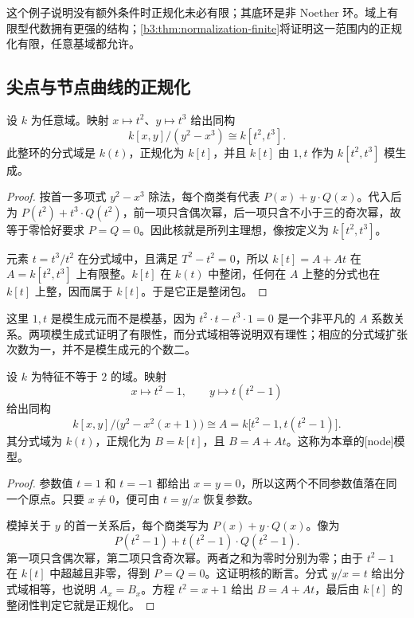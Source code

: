 这个例子说明没有额外条件时正规化未必有限；其底环是非 Noether 环。域上有限型代数拥有更强的结构；\cref{b3:thm:normalization-finite}将证明这一范围内的正规化有限，任意基域都允许。

\subsection{尖点与节点曲线的正规化}\label{b3:subsec:0604:03}

\begin{proposition}\label{b3:prop:cusp-normalization}
	设 \(k\) 为任意域。映射 \(x\mapsto t^2\)、\(y\mapsto t^3\) 给出同构
	\[
		k[x,y]/(y^2-x^3)\cong k[t^2,t^3].
	\]
	此整环的分式域是 \(k(t)\)，正规化为 \(k[t]\)，并且 \(k[t]\) 由 \(1,t\) 作为 \(k[t^2,t^3]\) 模生成。
\end{proposition}
\begin{proof}
	按首一多项式 \(y^2-x^3\) 除法，每个商类有代表 \(P(x)+y\cdot Q(x)\)。代入后为 \(P(t^2)+t^3\cdot Q(t^2)\)，前一项只含偶次幂，后一项只含不小于三的奇次幂，故等于零恰好要求 \(P=Q=0\)。因此核就是所列主理想，像按定义为 \(k[t^2,t^3]\)。

	元素 \(t=t^3/t^2\) 在分式域中，且满足 \(T^2-t^2=0\)，所以 \(k[t]=A+At\) 在 \(A=k[t^2,t^3]\) 上有限整。\(k[t]\) 在 \(k(t)\) 中整闭，任何在 \(A\) 上整的分式也在 \(k[t]\) 上整，因而属于 \(k[t]\)。于是它正是整闭包。
\end{proof}

这里 \(1,t\) 是模生成元而不是模基，因为 \(t^2\cdot t-t^3\cdot1=0\) 是一个非平凡的 \(A\) 系数关系。两项模生成式证明了有限性，而分式域相等说明双有理性；相应的分式域扩张次数为一，并不是模生成元的个数二。

\begin{proposition}\label{b3:prop:node-normalization}
	设 \(k\) 为特征不等于 \(2\) 的域。映射
	\[
		x\longmapsto t^2-1,\qquad y\longmapsto t(t^2-1)
	\]
	给出同构
	\[
		k[x,y]/\bigl(y^2-x^2(x+1)\bigr) \cong A=k\bigl[t^2-1,t(t^2-1)\bigr].
	\]
	其分式域为 \(k(t)\)，正规化为 \(B=k[t]\)，且 \(B=A+At\)。这称为本章的[node]模型。
\end{proposition}
\begin{proof}
	参数值 \(t=1\) 和 \(t=-1\) 都给出 \(x=y=0\)，所以这两个不同参数值落在同一个原点。只要 \(x\ne0\)，便可由 \(t=y/x\) 恢复参数。

	模掉关于 \(y\) 的首一关系后，每个商类写为 \(P(x)+y\cdot Q(x)\)。像为
	\[
		P(t^2-1)+t(t^2-1)\cdot Q(t^2-1).
	\]
	第一项只含偶次幂，第二项只含奇次幂。两者之和为零时分别为零；由于 \(t^2-1\) 在 \(k[t]\) 中超越且非零，得到 \(P=Q=0\)。这证明核的断言。分式 \(y/x=t\) 给出分式域相等，也说明 \(A_x=B_x\)。方程 \(t^2=x+1\) 给出 \(B=A+At\)，最后由 \(k[t]\) 的整闭性判定它就是正规化。
\end{proof}

